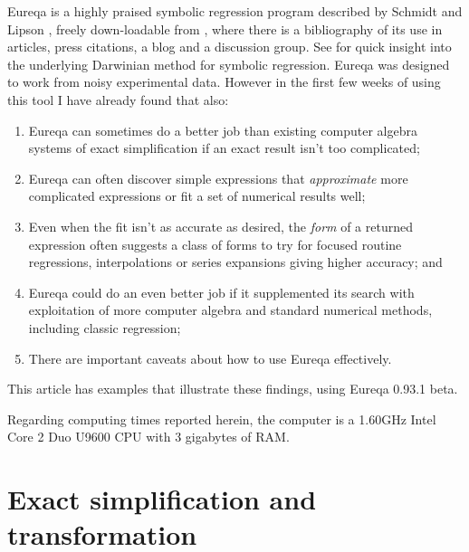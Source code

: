 \documentclass[12pt,english]{article}
\begin{document}
Eureqa is a highly praised symbolic regression program described by
Schmidt and Lipson \cite{SchmidtAndLipson}, freely down-loadable
from \cite{Schmidt}, where there is a bibliography of its use in
articles, press citations, a blog and a discussion group. See \cite{KozaExampleOfGeneticProgramming}
for quick insight into the underlying Darwinian method for symbolic
regression. Eureqa was designed to work from noisy experimental data.
However in the first few weeks of using this tool I have already found
that also:\vspace{-5pt}

\begin{enumerate}
\item Eureqa can sometimes do a better job than existing computer algebra
systems of exact simplification if an exact result isn't too complicated;\vspace{-5pt}

\item Eureqa can often discover simple expressions that \textsl{approximate}
more complicated expressions or fit a set of numerical results well;\vspace{-5pt}

\item Even when the fit isn't as accurate as desired, the \textsl{form}
of a returned expression often suggests a class of forms to try for
focused routine regressions, interpolations or series expansions giving
higher accuracy; and\vspace{-5pt}

\item Eureqa could do an even better job if it supplemented its search with
exploitation of more computer algebra and standard numerical methods,
including classic regression;\vspace{-5pt}

\item There are important caveats about how to use Eureqa effectively.\vspace{-5pt}

\end{enumerate}
This article has examples that illustrate these findings, using Eureqa
0.93.1 beta.

Regarding computing times reported herein, the computer is a 1.60GHz
Intel Core 2 Duo U9600 CPU with 3 gigabytes of RAM.


\section{Exact simplification and transformation}
\end{document}
